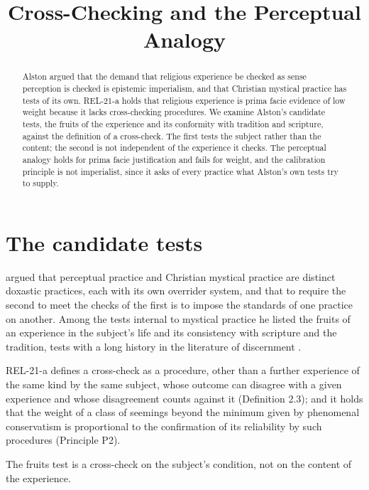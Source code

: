 \documentclass{situationist-preprint}
\title{Cross-Checking and the Perceptual Analogy}
\begin{document}
\maketitle

\begin{abstract}
Alston argued that the demand that religious experience be checked as sense perception is checked is epistemic imperialism, and that Christian mystical practice has tests of its own. REL-21-a holds that religious experience is prima facie evidence of low weight because it lacks cross-checking procedures. We examine Alston's candidate tests, the fruits of the experience and its conformity with tradition and scripture, against the definition of a cross-check. The first tests the subject rather than the content; the second is not independent of the experience it checks. The perceptual analogy holds for prima facie justification and fails for weight, and the calibration principle is not imperialist, since it asks of every practice what Alston's own tests try to supply.
\end{abstract}

\section{The candidate tests}

\citet[ch.~5]{Alston1991} argued that perceptual practice and Christian mystical practice are distinct doxastic practices, each with its own overrider system, and that to require the second to meet the checks of the first is to impose the standards of one practice on another. Among the tests internal to mystical practice he listed the fruits of an experience in the subject's life and its consistency with scripture and the tradition, tests with a long history in the literature of discernment \citep{Edwards1746}.

REL-21-a defines a cross-check as a procedure, other than a further experience of the same kind by the same subject, whose outcome can disagree with a given experience and whose disagreement counts against it (Definition 2.3); and it holds that the weight of a class of seemings beyond the minimum given by phenomenal conservatism is proportional to the confirmation of its reliability by such procedures (Principle P2).

\begin{proposition}\label{p:fruits}
The fruits test is a cross-check on the subject's condition, not on the content of the experience.
\end{proposition}
\end{document}
